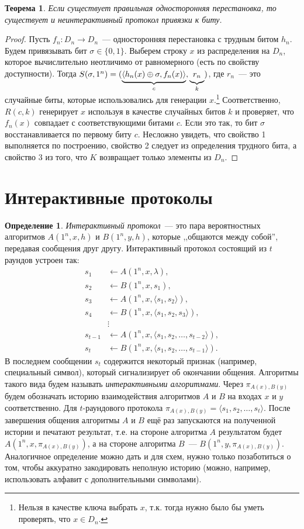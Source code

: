 \documentclass[12pt,a4paper]{article}
\newcommand{\bits}{\{0,1\}}
\theoremstyle{definition}
\newtheorem{definition}{Определение}[section]
\theoremstyle{plain}
\newtheorem{theorem}{Теорема}[section]
\theoremstyle{remark}
\begin{document}
\begin{theorem}
Если существует правильная односторонняя перестановка, то существует и 
неинтерактивный протокол привязки к биту.
\end{theorem}
\begin{proof}
Пусть $f_n : D_n\to D_n$~--- односторонняя перестановка с трудным битом $h_n$.
Будем привязывать бит $\sigma\in\bits$. Выберем строку $x$ из распределения 
на $D_n$, которое вычислительно неотличимо от равномерного (есть по свойству доступности).
Тогда $S(\sigma, 1^n) = (\underbrace{\strut\langle h_n(x)\oplus \sigma, f_n(x)\rangle}_{c}, \underbrace{\strut r_n}_{k})$, где $r_n$~--- это случайные биты, которые использовались для генерации $x$.\footnote{Нельзя в качестве ключа выбрать $x$, т.к. тогда нужно было бы уметь проверять, что $x\in D_n$.} Соответственно, $R(c, k)$ генерирует $x$ используя в качестве случайных битов $k$ и проверяет, что $f_n(x)$ совпадает с соответствующими битами $c$. Если это так, то бит $\sigma$ восстанавливается по первому биту $c$. Несложно увидеть, что свойство 1 выполняется по построению, свойство 2 следует из определения трудного бита, а свойство 3 из того, что $K$ возвращает только элементы из $D_n$.
\end{proof}

\section{Интерактивные протоколы}
\begin{definition}
\emph{Интерактивный протокол}~--- это пара вероятностных алгоритмов $A(1^n, x, h)$ и $B(1^n, y, h)$,
которые ,,общаются между собой'', передавая сообщения друг другу.
Интерактивный протокол состоящий из $t$ раундов устроен так:
\begin{align*}
s_1&\gets A(1^n, x, \lambda),\\
s_2&\gets B(1^n, x, s_1),\\
s_3&\gets A(1^n, x, \langle s_1, s_2\rangle),\\
s_4&\gets B(1^n, x, \langle s_1, s_2, s_3\rangle),\\
&\vdots\\
s_{t-1}&\gets A(1^n, x, \langle s_1, s_2,\dotsc,s_{t-2}\rangle),\\
s_{t}  &\gets B(1^n, x, \langle s_1, s_2,\dotsc,s_{t-1}\rangle).
\end{align*}
В последнем сообщении $s_t$ содержится некоторый признак (например, специальный символ),
который сигнализирует об окончании общения.
Алгоритмы такого вида будем называть \emph{интерактивными алгоритмами}.
Через $\pi_{A(x),B(y)}$ будем обозначать историю взаимодействия алгоритмов $A$ и $B$
на входах $x$ и $y$ соответственно. Для $t$-раундового протокола $\pi_{A(x),B(y)} = \langle s_1, s_2,\dotsc,s_{t}\rangle$. После завершения общения алгоритмы $A$ и $B$ ещё раз запускаются 
на полученной истории и печатают результат, т.е. на стороне алгоритма $A$ результатом будет
$A(1^n, x, \pi_{A(x),B(y)})$, а на стороне алгоритма $B$~--- $B(1^n, y, \pi_{A(x),B(y)})$. 
Аналогичное определение можно дать и для схем, нужно только позаботиться о том, чтобы аккуратно
закодировать неполную историю (можно, например, использовать алфавит с дополнительными символами).
\end{definition}
\end{document}
